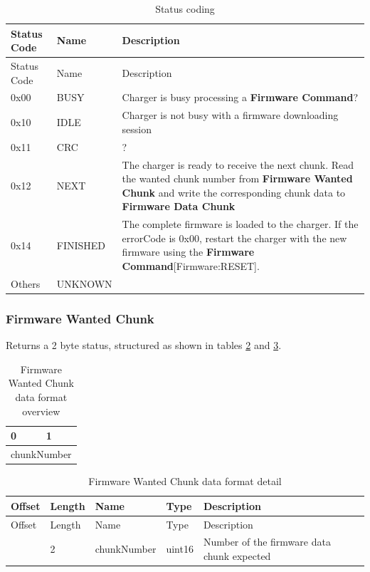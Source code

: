 \documentclass[a4paper]{article}
\begin{document}
\begin{longtable}[]{@{}llp{12cm}@{}}
	\caption{Status coding}
	\label{table.66}
	\tabularnewline
	\toprule\noalign{}
	Status Code & Name     & Description                                              \\
	\midrule\noalign{}
	\endfirsthead
	\toprule\noalign{}
	Status Code & Name     & Description                                              \\
	\midrule\noalign{}
	\endhead
	\bottomrule\noalign{}
	\endlastfoot
	0x00        & BUSY     & Charger is busy processing a \textbf{Firmware Command}?  \\
	0x10        & IDLE     & Charger is not busy with a firmware downloading session  \\
	0x11        & CRC      & ?                                                        \\
	0x12        & NEXT     & The charger is ready to receive the next chunk. 
	Read the wanted chunk number from \textbf{Firmware Wanted Chunk} and 
	write the 	corresponding chunk data to \textbf{Firmware Data Chunk} \\
	0x14        & FINISHED & The complete firmware is loaded to the charger. 
	If the   errorCode is 0x00, restart the charger with the new firmware using the
	\textbf{Firmware Command}{[}Firmware:RESET{]}. \\
	Others      & UNKNOWN  &                                                          \\
\end{longtable}

\subsubsection{Firmware Wanted Chunk}
\label{firmware_wanted_chunk}

Returns a 2 byte status, structured as shown in tables \ref{table.71} and \ref{table.72}.

\begin{longtable}[]{|l|l|}
	\caption{Firmware Wanted Chunk data format overview}
	\label{table.71}\\  %
	\hline
	0 & 1 \\
	\hline
	\multicolumn{2}{|l|}{%
	chunkNumber} \\
	\hline
\end{longtable}

\hfill\break

\begin{longtable}[]{@{}lllll@{}}
	\caption{Firmware Wanted Chunk data format detail}
	\label{table.72}
	\tabularnewline
	\toprule\noalign{}
	Offset & Length & Name        & Type   & Description                       \\
	\midrule\noalign{}
	\endfirsthead
	\toprule\noalign{}
	Offset & Length & Name        & Type   & Description                       \\
	\midrule\noalign{}
	\endhead
	\bottomrule\noalign{}
	\endlastfoot
	0      & 2      & chunkNumber & uint16 & Number of the firmware data chunk 
	expected \\
\end{longtable}
\end{document}
